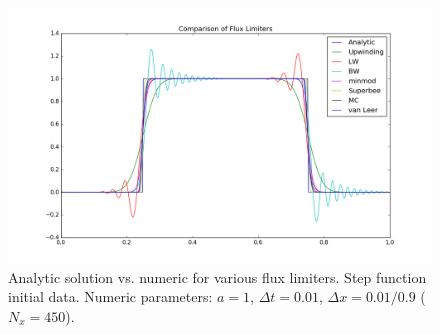 \documentclass[12pt]{article}
\begin{document}
\begin{figure}[H]
\centering\includegraphics[scale=0.45]{stepfn_fluxcomp.png}
\caption{Analytic solution vs. numeric for various flux limiters. Step function initial data. Numeric parameters: $a=1$, $\Delta t = 0.01$, $\Delta x = 0.01/0.9$ ($N_x = 450$).}
\end{figure}
\end{document}
